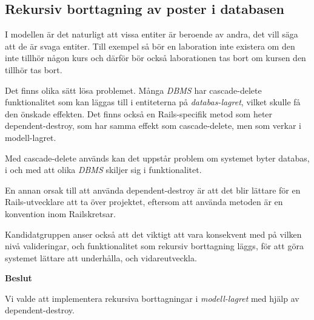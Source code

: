 \subsection{Rekursiv borttagning av poster i databasen}

I modellen är det naturligt att vissa entiter är beroende av andra, det vill säga att de är svaga entiter. Till exempel så bör en laboration inte existera om den inte tillhör någon kurs och därför bör också laborationen tas bort om kursen den tillhör tas bort. 

Det finns olika sätt lösa problemet. Många \emph{DBMS} har cascade-delete funktionalitet som kan läggas till i entiteterna på \emph{databas-lagret}, vilket skulle få den önskade effekten. Det finns också en Rails-specifik metod som heter dependent-destroy, som har samma effekt som cascade-delete, men som verkar i modell-lagret.

Med cascade-delete används kan det uppstår problem om systemet byter databas, i och med att olika \emph{DBMS} skiljer sig i funktionalitet.

En annan orsak till att använda dependent-destroy är att det blir lättare för en Rails-utvecklare att ta över projektet, eftersom att använda metoden är en konvention inom Railskretsar.

Kandidatgruppen anser också att det viktigt att vara konsekvent med på vilken nivå valideringar, och funktionalitet som rekursiv borttagning läggs, för att göra systemet lättare att underhålla, och vidareutveckla.   

\begin{flushright}
  
  \textbf{Beslut}
  
  Vi valde att implementera rekursiva borttagningar i \emph{modell-lagret} med hjälp av dependent-destroy.
\end{flushright}
